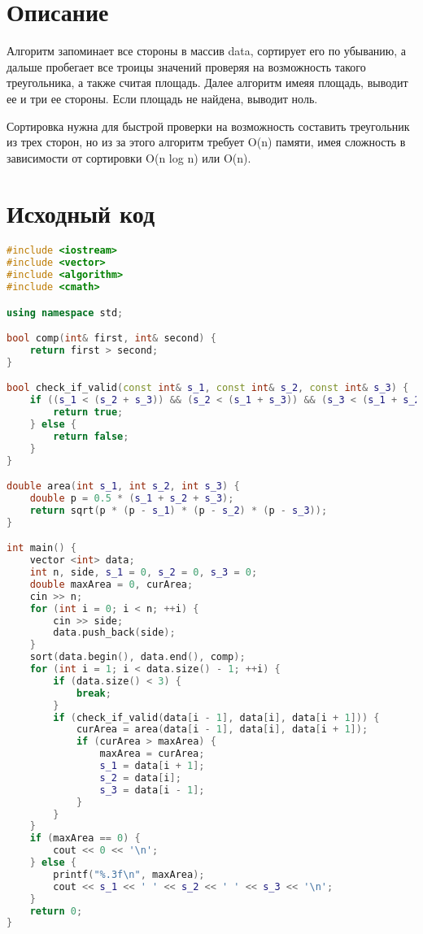 \section{Описание}

Алгоритм запоминает все стороны в массив data, сортирует его по убыванию, а дальше пробегает все троицы значений проверяя на возможность такого треугольника, а также считая площадь. Далее алгоритм имеяя площадь, выводит ее и три ее стороны. Если площадь не найдена, выводит ноль.

Сортировка нужна для быстрой проверки на возможность составить треугольник из трех сторон, но из за этого алгоритм требует O(n) памяти, имея сложность в зависимости от сортировки O(n log n) или O(n).


\pagebreak

\section{Исходный код}

\begin{lstlisting}[language=C++]
#include <iostream>
#include <vector>
#include <algorithm>
#include <cmath>

using namespace std;

bool comp(int& first, int& second) {
    return first > second;
}

bool check_if_valid(const int& s_1, const int& s_2, const int& s_3) {
    if ((s_1 < (s_2 + s_3)) && (s_2 < (s_1 + s_3)) && (s_3 < (s_1 + s_2))) {
        return true;
    } else {
        return false;
    }
}

double area(int s_1, int s_2, int s_3) {
    double p = 0.5 * (s_1 + s_2 + s_3);
    return sqrt(p * (p - s_1) * (p - s_2) * (p - s_3));
}

int main() {
    vector <int> data;
    int n, side, s_1 = 0, s_2 = 0, s_3 = 0;
    double maxArea = 0, curArea;
    cin >> n;
    for (int i = 0; i < n; ++i) {
        cin >> side;
        data.push_back(side);
    }
    sort(data.begin(), data.end(), comp);
    for (int i = 1; i < data.size() - 1; ++i) {
        if (data.size() < 3) {
            break;
        }
        if (check_if_valid(data[i - 1], data[i], data[i + 1])) {
            curArea = area(data[i - 1], data[i], data[i + 1]);
            if (curArea > maxArea) {
                maxArea = curArea;
                s_1 = data[i + 1];
                s_2 = data[i];
                s_3 = data[i - 1];
            }
        }
    }
    if (maxArea == 0) {
        cout << 0 << '\n';
    } else {
        printf("%.3f\n", maxArea);
        cout << s_1 << ' ' << s_2 << ' ' << s_3 << '\n';
    }
    return 0;
}
\end{lstlisting}


